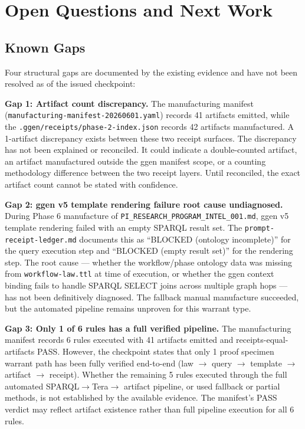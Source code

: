 
\section{Open Questions and Next Work}
\label{sec:research-prompt-manufactory-open}

\subsection{Known Gaps}
\label{sec:research-prompt-manufactory-open-gaps}

Four structural gaps are documented by the existing evidence and have not been resolved
as of the issued checkpoint:

\textbf{Gap 1: Artifact count discrepancy.} The manufacturing manifest
(\texttt{manufacturing-manifest-20260601.yaml}) records 41 artifacts emitted, while the
\texttt{.ggen/receipts/phase-2-index.json} records 42 artifacts manufactured. A
1-artifact discrepancy exists between these two receipt surfaces. The discrepancy has
not been explained or reconciled. It could indicate a double-counted artifact, an
artifact manufactured outside the ggen manifest scope, or a counting methodology
difference between the two receipt layers. Until reconciled, the exact artifact count
cannot be stated with confidence.

\textbf{Gap 2: ggen v5 template rendering failure root cause undiagnosed.} During
Phase 6 manufacture of \texttt{PI\_RESEARCH\_PROGRAM\_INTEL\_001.md}, ggen v5 template
rendering failed with an empty SPARQL result set. The \texttt{prompt-receipt-ledger.md}
documents this as ``BLOCKED (ontology incomplete)'' for the query execution step and
``BLOCKED (empty result set)'' for the rendering step. The root cause --- whether the
workflow/phase ontology data was missing from \texttt{workflow-law.ttl} at time of
execution, or whether the ggen context binding fails to handle SPARQL SELECT joins
across multiple graph hops --- has not been definitively diagnosed. The fallback manual
manufacture succeeded, but the automated pipeline remains unproven for this warrant type.

\textbf{Gap 3: Only 1 of 6 rules has a full verified pipeline.} The manufacturing
manifest records 6 rules executed with 41 artifacts emitted and receipts-equal-artifacts
PASS. However, the checkpoint states that only 1 proof specimen warrant path has been
fully verified end-to-end (law $\to$ query $\to$ template $\to$ artifact $\to$ receipt).
Whether the remaining 5 rules executed through the full automated SPARQL$\to$Tera$\to$
artifact pipeline, or used fallback or partial methods, is not established by the
available evidence. The manifest's PASS verdict may reflect artifact existence rather
than full pipeline execution for all 6 rules.

